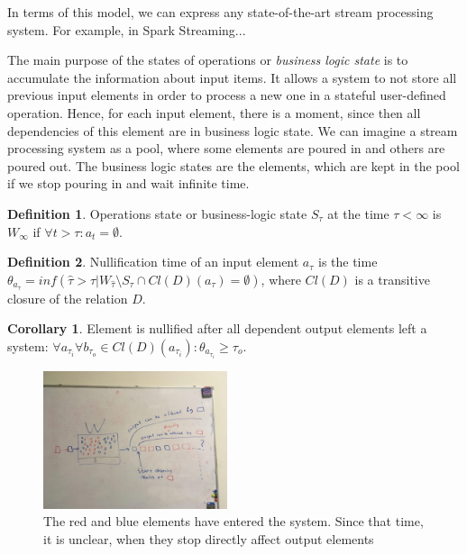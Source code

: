 \documentclass[sigconf]{acmart}
\theoremstyle{definition}
\newtheorem{definition}{Definition}
\newtheorem{corollary}{Corollary}
\begin{document}
In terms of this model, we can express any state-of-the-art stream processing system. For example, in Spark Streaming...

The main purpose of the states of operations or {\em business logic state} is to accumulate the information about input items. It allows a system to not store all previous input elements in order to process a new one in a stateful user-defined operation. Hence, for each input element, there is a moment, since then all dependencies of this element are in business logic state. We can imagine a stream processing system as a pool, where some elements are poured in and others are poured out. The business logic states are the elements, which are kept in the pool if we stop pouring in and wait infinite time.

\begin{definition}{Operations state or business-logic state}
$S_\tau$ at the time $\tau<\infty$ is $W_\infty$ if $\forall t>\tau: a_t=\emptyset$.
\end{definition}

\begin{definition}{Nullification time}
of an input element $a_\tau$ is the time $\theta_{a_\tau}=inf(\hat{\tau}>\tau|W_{\hat{\tau}}\setminus{S_{\hat{\tau}}}\cap{Cl(D)(a_\tau)=\emptyset})$, where $Cl(D)$ is a transitive closure of the relation $D$.
\end{definition}

\begin{corollary}
Element is nullified after all dependent output elements left a system: $\forall{a_{\tau_i}}\forall{b_{\tau_o}\in{Cl(D)(a_{\tau_i})}}:\theta_{a_{\tau_i}}\geq\tau_o$.
\end{corollary}

\begin{figure}[htbp]
  \centering
  \includegraphics[width=0.48\textwidth]{pics/nullification}
  \caption{The red and blue elements have entered the system. Since that time, it is unclear, when they stop directly affect output elements}
  \label {nullification}
\end{figure}
\end{document}
